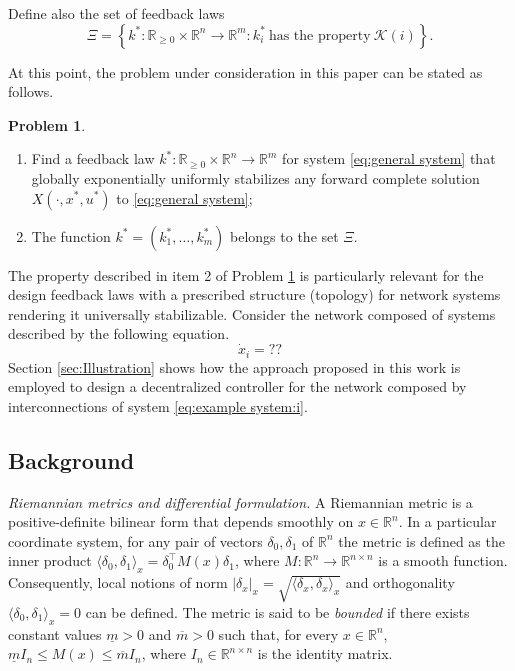 \documentclass[10pt,twocolumn,twoside]{IEEEtran}
\theoremstyle{plain}
\theoremstyle{definition}
\newtheorem{problem}[theorem]{Problem}
\theoremstyle{remark}
\begin{document}
Define also the set of feedback laws
\begin{equation*}
	\Xi=\left\{k^\ast:\mathbb{R}_{\geq0}\times\mathbb{R}^n\to\mathbb{R}^m:k_i^\ast\ \text{has the property}\ \mathscr{K}(i)\right\}.
\end{equation*}

At this point, the problem under consideration in this paper can be stated as follows.

\begin{problem}\label{problem formulation}\hfill
	\begin{enumerate}
		\item Find a feedback law $k^\ast:\mathbb{R}_{\geq0}\times\mathbb{R}^n\to\mathbb{R}^m$ for system \eqref{eq:general system} that globally exponentially uniformly stabilizes any forward complete solution $X(\cdot,x^\ast,u^\ast)$ to \eqref{eq:general system};
		
		\item The function $k^\ast=(k_1^\ast,\ldots,k_m^\ast)$ belongs to the set $\Xi$.
		\end{enumerate}
\end{problem}



The property described in item 2 of Problem \ref{problem formulation} is particularly relevant for the design feedback laws with a prescribed structure (topology) for network systems rendering it universally stabilizable. Consider the network composed of systems described by the following equation.
\begin{equation}\label{eq:example system:i}
	\dot{x}_i=??
\end{equation}
Section \ref{sec:Illustration} shows how the approach proposed in this work is employed to design a decentralized controller for the network composed by interconnections of system \eqref{eq:example system:i}.

\subsection{Background}

{\itshape Riemannian metrics and differential formulation.} A Riemannian metric is a positive-definite bilinear form that depends smoothly on $x\in\mathbb{R}^n$. In a particular coordinate system, for any pair of vectors $\delta_0,\delta_1$ of $\mathbb{R}^n$ the metric is defined as the inner product $\langle\delta_0,\delta_{ 1}\rangle_x=\delta_0^\top M(x)\delta_1$, where $M:\mathbb{R}^n\to\mathbb{R}^{n\times n}$ is a smooth function. Consequently, local notions of norm $|\delta_x|_x=\sqrt{\langle\delta_x,\delta_x\rangle_x}$ and orthogonality $\langle\delta_0,\delta_1\rangle_x=0$ can be defined. The metric is said to be \emph{bounded} if there exists constant values $\underline{m}>0$ and $\overline{m}>0$ such that, for every $x\in\mathbb{R}^n$, $\underline{m}I_n\leq M(x)\leq \overline{m}I_n$, where $I_n\in\mathbb{R}^{n\times n}$ is the identity matrix.
\end{document}
